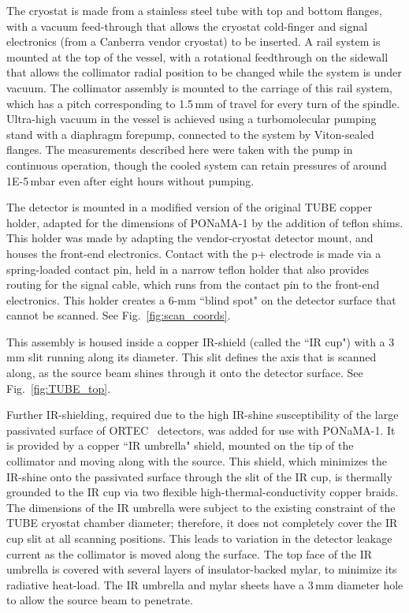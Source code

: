 \documentclass[groupedaddress,rmp,amsmath,amssymb,bibnotes,altaffilletter,twocolumn]{revtex4-1}
\begin{document}
The cryostat is made from a stainless steel tube with top and bottom flanges, with a vacuum feed-through that allows the cryostat cold-finger and signal electronics (from a Canberra vendor cryostat) to be inserted. A rail system is mounted at the top of the vessel, with a rotational feedthrough on the sidewall that allows the collimator radial position to be changed while the system is under vacuum. The collimator assembly is mounted to the carriage of this rail system, which has a pitch corresponding to 1.5\,mm of travel for every turn of the spindle. Ultra-high vacuum in the vessel is achieved using a turbomolecular pumping stand with a diaphragm forepump, connected to the system by Viton-sealed flanges. The measurements described here were taken with the pump in continuous operation, though the cooled system can retain pressures of around 1E-5\,mbar even after eight hours without pumping. 

The detector is mounted in a modified version of the original TUBE copper holder, adapted for the dimensions of PONaMA-1 by the addition of teflon shims. This holder was made by adapting the vendor-cryostat detector mount, and houses the front-end electronics. Contact with the p+ electrode is made via a spring-loaded contact pin, held in a narrow teflon holder that also provides routing for the signal cable, which runs from the contact pin to the front-end electronics. This holder creates a 6-mm ``blind spot" on the detector surface that cannot be scanned. See Fig.~\ref{fig:scan_coords}. 

This assembly is housed inside a copper IR-shield (called the ``IR cup") with a 3\,mm slit running along its diameter. This slit defines the axis that is scanned along, as the source beam shines through it onto the detector surface. See Fig.~\ref{fig:TUBE_top}. 

Further IR-shielding, required due to the high IR-shine susceptibility of the large passivated surface of ORTEC \ppc\ detectors, was added for use with PONaMA-1. It is provided by a copper ``IR umbrella" shield, mounted on the tip of the collimator and moving along with the source. This shield, which minimizes the IR-shine onto the passivated surface through the slit of the IR cup, is thermally grounded to the IR cup via two flexible high-thermal-conductivity copper braids. The dimensions of the IR umbrella were subject to the existing constraint of the TUBE cryostat chamber diameter; therefore, it does not completely cover the IR cup slit at all scanning positions. This leads to variation in the detector leakage current as the collimator is moved along the surface. The top face of the IR umbrella is covered with several layers of insulator-backed mylar, to minimize its radiative heat-load. The IR umbrella and mylar sheets have a 3\,mm diameter hole to allow the source beam to penetrate. 
\end{document}
